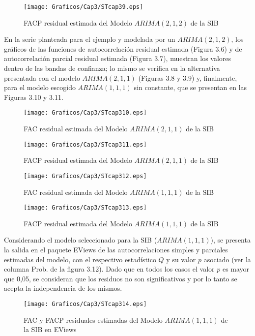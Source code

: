 \begin{figure}[H]
\centering
\texttt{[image: Graficos/Cap3/STcap39.eps]}
\caption{FACP residual estimada del Modelo $ARIMA(2,1,2)$ de la SIB}
\end{figure}


\begin{ejemplo}
En la serie planteada para el ejemplo y modelada por un $ARIMA(2,1,2)$, los gr\'{a}ficos de las funciones de autocorrelaci\'{o}n residual estimada (Figura 3.6) y de autocorrelaci\'{o}n parcial residual estimada (Figura 3.7), muestran los valores dentro de las bandas de confianza; lo mismo se verifica en la alternativa presentada con el modelo $ARIMA(2,1,1)$ (Figuras 3.8 y 3.9) y, finalmente, para el modelo escogido 
$ARIMA(1,1,1)$ sin constante, que se presentan en las Figuras 3.10 y 3.11.

\begin{figure}[H]
\centering
\texttt{[image: Graficos/Cap3/STcap310.eps]}
\caption{FAC residual estimada del Modelo $ARIMA(2,1,1)$ de la SIB}
\end{figure}


\begin{figure}[H]
\centering
\texttt{[image: Graficos/Cap3/STcap311.eps]}
\caption{FACP residual estimada del Modelo $ARIMA(2,1,1)$ de la SIB}
\end{figure}


\begin{figure}[H]
\centering
\texttt{[image: Graficos/Cap3/STcap312.eps]}
\caption{FAC residual estimada del Modelo $ARIMA(1,1,1)$ de la SIB}
\end{figure}


\begin{figure}[H]
\centering
\texttt{[image: Graficos/Cap3/STcap313.eps]}
\caption{FACP residual estimada del Modelo $ARIMA(1,1,1)$ de la SIB}
\end{figure}


Considerando el modelo seleccionado para la SIB ($ARIMA(1,1,1)$), se presenta la salida en el paquete EViews de las autocorrelaciones simples y parciales estimadas del modelo, con el respectivo estad\'{i}stico $Q$ y su valor $p$ asociado (ver la columna Prob. de la figura 3.12). Dado que en todos los casos el valor $p$ es mayor que 0,05, se consideran que los residuos no son significativos y por lo tanto se acepta la independencia de los mismos.

\begin{figure}[H]
\centering
\texttt{[image: Graficos/Cap3/STcap314.eps]}
\caption{FAC y FACP residuales estimadas del Modelo $ARIMA(1,1,1)$ de la SIB en EViews}
\end{figure}
\end{ejemplo}


